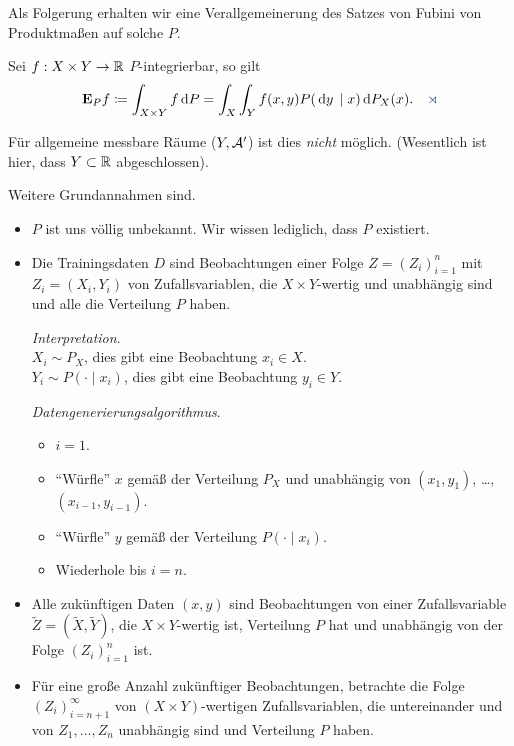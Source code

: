 Als Folgerung erhalten wir eine Verallgemeinerung des Satzes von Fubini von
Produktmaßen auf solche $P$.

\begin{cor*}
Sei $f: X\times Y\to \R$ $P$-integrierbar, so gilt
\begin{align*}
\E_P f\defl \int_{X\times Y} f\dP = \int_X \int_Y f(x,y)
P(\dy\mid x)\dP_X(x).\fishhere
\end{align*}
\end{cor*}

\begin{bem*}
Für allgemeine messbare Räume ($Y,\AA'$) ist dies \textit{nicht} möglich.
(Wesentlich ist hier, dass $Y\subset \R$ abgeschlossen).\maphere
\end{bem*}

\noindent
Weitere Grundannahmen sind.
\begin{itemize}
  \item $P$ ist uns völlig unbekannt. Wir wissen lediglich, dass $P$ existiert.
  \item Die Trainingsdaten $D$ sind Beobachtungen einer Folge $Z=(Z_i)_{i=1}^n$
  mit $Z_i=(X_i,Y_i)$ von Zufallsvariablen, die $X\times Y$-wertig und
  unabhängig sind und alle die Verteilung $P$ haben.

\noindent
\textit{Interpretation}.\\
$X_i\sim P_X$, dies gibt eine Beobachtung $x_i\in X$.\\
$Y_i\sim P(\cdot\mid x_i)$, dies gibt eine Beobachtung $y_i\in Y$.

\noindent
\textit{Datengenerierungsalgorithmus}.\\
\begin{itemize}
  \item $i=1$.
  \item ``Würfle'' $x$ gemäß der Verteilung $P_X$ und unabhängig von
  $(x_1,y_1)$, \ldots, $(x_{i-1},y_{i-1})$.
  \item ``Würfle'' $y$ gemäß der Verteilung $P(\cdot\mid x_i)$.
  \item Wiederhole bis $i=n$.
\end{itemize}
\item Alle zukünftigen Daten $(x,y)$ sind Beobachtungen von einer
Zufallsvariable $\tilde{Z} = (\tilde{X},\tilde{Y})$, die $X\times Y$-wertig
ist, Verteilung $P$ hat und unabhängig von der Folge $(Z_i)_{i=1}^n$ ist.
\item Für eine große Anzahl zukünftiger Beobachtungen, betrachte die Folge
$(Z_i)_{i=n+1}^\infty$ von $(X\times Y)$-wertigen Zufallsvariablen, die
untereinander und von $Z_1,\ldots,Z_n$ unabhängig sind und Verteilung $P$ haben.
\end{itemize}

